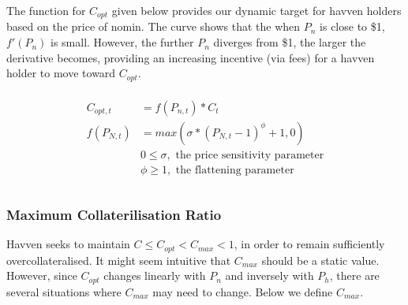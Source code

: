 \noindent The function for $C_{opt}$ given below provides our dynamic target for havven holders based on the price of nomin. The curve shows that the when $P_n$ is close to \$1, $ f'(P_n) $ is small. However, the further $P_n$ diverges from \$1, the larger the derivative becomes, providing an increasing incentive (via fees) for a havven holder to move toward $C_{opt}$.

\begin{gather} 
\begin{align}
\begin{split}
C_{opt,t} &= f(P_{n,t}) * C_t  \\ 
f(P_{N,t}) &= max(\sigma * (P_{N,t} - 1)^{\phi} + 1, 0) \\
& 0 \leq \sigma, \text{ the price sensitivity parameter} \\
& \phi \geq 1, \text{ the flattening parameter} \\
\end{split}
\end{align}
\end{gather}


\begin{center}
\end{center}

\newpage

\subsubsection{Maximum Collaterilisation Ratio}

\noindent Havven seeks to maintain $C \leq C_{opt} < C_{max} < 1$, in order to remain sufficiently overcollateralised. It might seem intuitive that $C_{max}$ should be a static value. However, since $C_{opt}$ changes linearly with $P_n$ and inversely with $P_h$, there are several situations where $C_{max}$ may need to change. Below we define $C_{max}$. \\


